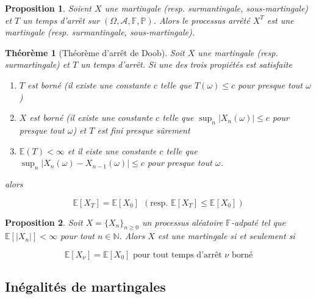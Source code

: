 \documentclass[10pt,a4paper,oneside]{article}
\newtheorem{theoreme}{Théorème}
\newtheorem{proposition}{Proposition}
\begin{document}
\begin{proposition}
Soient $X$ une martingale (resp. surmantingale, sous-martingale) et $T$ un temps d'arrêt sur $(\Omega, \mathcal{A}, \mathbb{F}, \mathbb{P})$. Alors le processus arrêté $X^T$ est une martingale (resp. surmantingale, sous-martingale).
\end{proposition}

\begin{theoreme}[Théorème d'arrêt de Doob]
Soit $X$ une martingale (resp. surmartingale) et $T$ un temps d'arrêt. Si une des trois propiétés est satisfaite

\begin{enumerate}
\item
$T$ est borné (il existe une constante $c$ telle que $T(\omega) \leq c$ pour presque tout $\omega$)

\item
$X$ est borné (il existe une constante $c$ telle que $\sup_n |X_n(\omega)| \leq c$ pour presque tout $\omega$) et $T$ est fini presque sûrement

\item
$\mathbb{E}(T) < \infty$ et il eiste une constante $c$ telle que $\sup_n |X_n(\omega) - X_{n - 1}(\omega)| \leq c$ pour presque tout $\omega$.
\end{enumerate}

alors

\[ \mathbb{E}[X_T] = \mathbb{E}[X_0]\ \ (\text{resp. } \mathbb{E}[X_T] \leq \mathbb{E}[X_0]) \]
\end{theoreme}

\begin{proposition}
Soit $X = \{ X_n \}_{n \geq 0}$ un processus aléatoire $\mathbb{F}$-adpaté tel que $\mathbb{E}[|X_n|] < \infty$ pour tout $n \in \mathbb{N}$. Alors $X$ est une martingale si et seulement si

\[ \mathbb{E}[X_\nu] = \mathbb{E}[X_0] \text{ pour tout temps d'arrêt } \nu \text{ borné} \]
\end{proposition}

\subsection{Inégalités de martingales}
\end{document}
